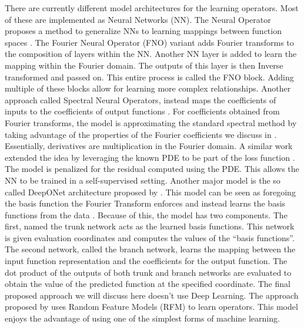 There are currently different model architectures for the learning operators. Most of these are implemented as Neural Networks (NN). The Neural Operator proposes a method to generalize NNs to learning mappings between function spaces \autocite{li2021fourier}. The Fourier Neural Operator (FNO) variant adds Fourier transforms to the composition of layers within the NN\@. Another NN layer is added to learn the mapping within the Fourier domain. The outputs of this layer is then Inverse transformed and passed on. This entire process is called the FNO block. Adding multiple of these blocks allow for learning more complex relationships. Another approach called Spectral Neural Operators, instead maps the coefficients of inputs to the coefficients of output functions \autocite{fanaskovSpectralNeuralOperators2023}. For coefficients obtained from Fourier transforms, the model is approximating the standard spectral method by taking advantage of the properties of the Fourier coefficients we discuss in . Essentially, derivatives are multiplication in the Fourier domain. A similar work extended the idea by leveraging the known PDE to be part of the loss function \autocite{du2024neural}. The model is penalized for the residual computed using the PDE\@. This allows the NN to be trained in a self-supervised setting. Another major model is the so called DeepONet architecture proposed by \textcite{luLearningNonlinearOperators2021}. This model can be seen as foregoing the basis function the Fourier Transform enforces and instead learns the basis functions from the data \autocite{meurisMachinelearningbasedSpectralMethods2023}. Because of this, the model has two components. The first, named the trunk network acts as the learned basis functions. This network is given evaluation coordinates and computes the values of the \enquote{basis functions}. The second network, called the branch network, learns the mapping between the input function representation and the coefficients for the output function. The dot product of the outputs of both trunk and branch networks are evaluated to obtain the value of the predicted function at the specified coordinate. The final proposed approach we will discuss here doesn't use Deep Learning. The approach proposed by \textcite{nelsenOperatorLearningUsing2024} uses Random Feature Models (RFM) to learn operators. This model enjoys the advantage of using one of the simplest forms of machine learning.


